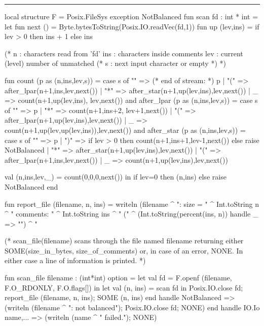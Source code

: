 \documentclass[12pt]{book}
\begin{document}
\bigskip
\hrule
\begin{smlcode}
local
  structure F = Posix.FileSys
  exception NotBalanced
  fun scan fd : int * int =
    let
      fun next () = Byte.bytesToString(Posix.IO.readVec(fd,1))
      fun up (lev,ins) = if lev > 0 then ins + 1
                         else ins

      (* n   : characters read from 'fd'
         ins : characters inside comments
         lev : current (level) number of unmatched (*
         s   : next input character or empty *) *)

      fun count (p as (n,ins,lev,s)) =
        case s of
          "" => (* end of stream: *) p
        | "(" => after_lpar(n+1,ins,lev,next())
        | "*" => after_star(n+1,up(lev,ins),lev,next())
        | _  => count(n+1,up(lev,ins), lev,next())
      and after_lpar (p as (n,ins,lev,s)) =
        case s of
          "" => p
        | "*" => count(n+1,ins+2, lev+1,next())
        | "(" => after_lpar(n+1,up(lev,ins),lev,next())
        | _ => count(n+1,up(lev,up(lev,ins)),lev,next())
      and after_star (p as (n,ins,lev,s)) =
        case s of
          "" => p
        | ")" => if lev > 0 then
                    count(n+1,ins+1,lev-1,next())
                 else raise NotBalanced
        | "*" => after_star(n+1,up(lev,ins),lev,next())
        | "(" => after_lpar(n+1,ins,lev,next())
        | _  => count(n+1,up(lev,ins),lev,next())

      val (n,ins,lev,_) = count(0,0,0,next())
    in if lev=0 then (n,ins) else raise NotBalanced
    end

  fun report_file (filename, n, ins) =
      writeln (filename ^ ": size = " ^ Int.toString n
               ^ " comments: " ^ Int.toString ins ^ " ("
               ^ (Int.toString(percent(ins, n))
                  handle _ => "") ^ "%

  (* scan_file(filename) scans through the file named filename
     returning either SOME(size_in_bytes, size_of_comments)
     or, in case of an error, NONE. In either case a line of
     information is printed. *)

  fun scan_file filename : (int*int) option =
      let val fd = F.openf (filename, F.O_RDONLY, F.O.flags[])
      in let val (n, ins) = scan fd
         in Posix.IO.close fd;
            report_file (filename, n, ins);
            SOME (n, ins)
         end handle NotBalanced =>
                    (writeln (filename ^ ": not balanced");
                     Posix.IO.close fd;
                     NONE)
      end handle IO.Io {name,...} =>
                 (writeln (name ^ " failed."); NONE)


\end{smlcode}
\end{document}
